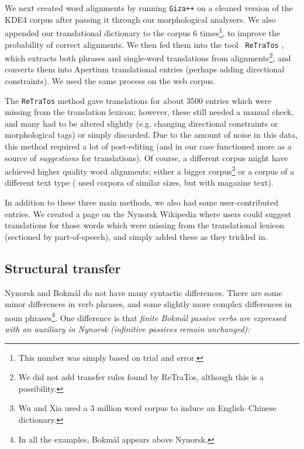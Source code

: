 \documentclass[11pt]{article}
\begin{document}
 We next created word alignments by running {\tt \small Giza++}
 \citep{och2003scv} on a cleaned version of the KDE4 corpus after
 passing it through our morphological analysers. We also appended our
 translational dictionary to the corpus 6 times\footnote{This number
   was simply based on trial and error.}, to improve the probability
 of correct alignments. We then fed them into the tool {\tt \small
   ReTraTos} \citep{caseli2006aib}, which extracts both phrases and
 single-word translations from alignments\footnote{We did not add
   transfer rules found by ReTraTos, although this is a possibility.},
 and converts them into Apertium translational entries (perhaps adding
 directional constraints).  We used the same process on the web
 corpus.

The {\tt \small ReTraTos} method gave translations for about 3500
entries which were missing from the translation lexicon; however,
these still needed a manual check, and many had to be altered
slightly (e.g.  changing directional constraints or morphological
tags) or simply discarded. Due to the amount of noise in this data,
this method required a lot of post-editing (and in our case functioned
more as a source of \emph{suggestions} for translations). Of course, a
different corpus might have achieved higher quality word alignments;
either a bigger corpus\footnote{Wu and Xia \citep[1994,
in][p.~230]{caseli2006aib} used a 3 million word corpus to induce an
English–Chinese dictionary.} or a corpus of a different text type
(\citet{caseli2006aib} used corpora of similar sizes, but with
magazine text).

In addition to these three main methods, we also had some
user-contributed entries. We created a page on the Nynorsk Wikipedia
where users could suggest translations for those words which were
missing from the translational lexicon (sectioned by part-of-speech), and
simply added these as they trickled in.


\subsection{Structural transfer}
\label{sec:structural-transfer}
Nynorsk and Bokmål do not have many syntactic differences. There
are some minor differences in verb phrases, and some slightly more
complex differences in noun phrases\footnote{In all the examples,
  Bokmål appears above Nynorsk.}. One difference is that \emph{finite
  Bokmål passive verbs are expressed with an auxiliary in Nynorsk
  (infinitive passives remain unchanged):}
\end{document}

